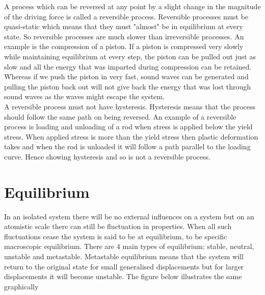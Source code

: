 \documentclass[12pt]{article}
\begin{document}
    A process which can be reversed at any point by a slight change in the magnitude of the driving force is called a reversible process. Reversible processes must be quasi-static which means that they must "almost" be in equilibrium at every state. So reversible processes are much slower than irreversible processes. An example is the compression of a piston. If a piston is compressed very slowly while maintaining equilibrium at every step, the piston can be pulled out just as slow and all the energy that was imparted during compression can be retained. Whereas if we push the piston in very fast, sound waves can be generated and pulling the piston back out will not give back the energy that was lost through sound waves as the waves might escape the system. \\
    
    A reversible process must not have hysteresis. Hysteresis means that the process should follow the same path on being reversed. An example of a reversible process is loading and unloading of a rod when stress is applied below the yield stress. When applied stress is more than the yield stress then plastic deformation takes and when the rod is unloaded it will follow a path parallel to the loading curve. Hence showing hysteresis and so is not a reversible process. \\
    \pagebreak
\section{Equilibrium}
    In an isolated system there will be no external influences on a system but on an atomistic scale there can still be fluctuation in properties. When all such fluctuations cease the system is said to be at equilibrium, to be specific macroscopic equilibrium. There are 4 main types of equilibrium: stable, neutral, unstable and metastable. Metastable equilibrium means that the system will return to the original state for small generalised displacements but for larger displacements it will become unstable. The figure below illustrates the same graphically \\
    
\end{document}
